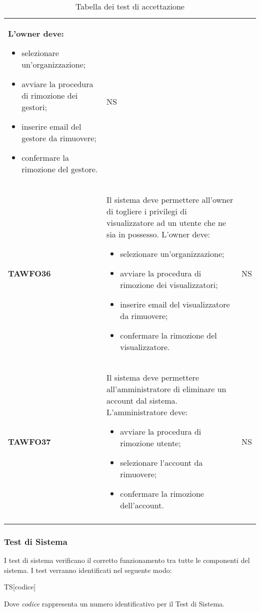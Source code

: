 \documentclass[../piano-di-qualifica.tex]{subfiles}
\begin{document}
\begin{centering}
\begin{longtable}[H]{>{\centering\bfseries}m{3cm} >{}p{10cm} >{\centering\arraybackslash}m{3cm}}
                L'owner deve:
                \begin{itemize}
                \item selezionare un'organizzazione;
                \item avviare la procedura di rimozione dei gestori;
                \item inserire email del gestore da rimuovere;
                \item confermare la rimozione del gestore.
                \end{itemize}
                & NS \\
        TAWFO36      & Il sistema deve permettere all'owner di togliere i privilegi di visualizzatore ad un utente che ne sia in possesso. \newline
                L'owner deve:
                \begin{itemize}
                \item selezionare un'organizzazione;
                \item avviare la procedura di rimozione dei visualizzatori;
                \item inserire email del visualizzatore da rimuovere;
                \item confermare la rimozione del visualizzatore.
                \end{itemize}
                & NS \\
        TAWFO37      & Il sistema deve permettere all'amministratore di eliminare un account dal sistema. \newline
                L'amministratore deve:
                \begin{itemize}
                \item avviare la procedura di rimozione utente;
                \item selezionare l'account da rimuovere;
                \item confermare la rimozione dell'account.
                \end{itemize}
                & NS \\
        \caption{Tabella dei test di accettazione}%
        \label{tab:test_accettazione}
      \end{longtable}
    \end{centering}
    \subsubsection{Test di Sistema}%
  \label{subs:sistema}
    I test di sistema verificano il corretto funzionamento tra tutte le componenti del sistema. I test verranno identificati nel seguente modo:
    \begin{center}
      TS[codice]
    \end{center}
    Dove \textit{codice} rappresenta un numero identificativo per il Test di Sistema.
\end{document}
